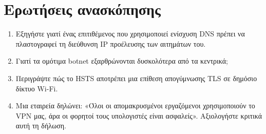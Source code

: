 \section*{Ερωτήσεις ανασκόπησης}
\begin{enumerate}
  \item Εξηγήστε γιατί ένας επιτιθέμενος που χρησιμοποιεί ενίσχυση DNS πρέπει να πλαστογραφεί τη διεύθυνση IP προέλευσης των αιτημάτων του.
  \item Γιατί τα ομότιμα botnet εξαρθρώνονται δυσκολότερα από τα κεντρικά;
  \item Περιγράψτε πώς το HSTS αποτρέπει μια επίθεση απογύμνωσης TLS σε δημόσιο δίκτυο Wi-Fi.
  \item Μια εταιρεία δηλώνει: «Όλοι οι απομακρυσμένοι εργαζόμενοι χρησιμοποιούν το VPN μας, άρα οι φορητοί τους υπολογιστές είναι ασφαλείς». Αξιολογήστε κριτικά αυτή τη δήλωση.
\end{enumerate}
